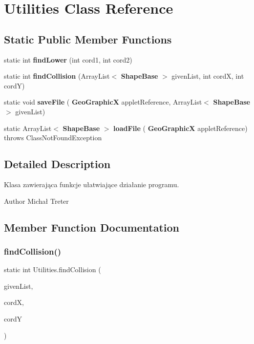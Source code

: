 \section{Utilities Class Reference}
\label{class_utilities}
\subsection*{Static Public Member Functions}
\begin{DoxyCompactItemize}
\item 
static int \textbf{ find\+Lower} (int cord1, int cord2)
\item 
static int \textbf{ find\+Collision} (Array\+List$<$ \textbf{ Shape\+Base} $>$ given\+List, int cordX, int cordY)
\item 
static void \textbf{ save\+File} (\textbf{ Geo\+GraphicX} applet\+Reference, Array\+List$<$ \textbf{ Shape\+Base} $>$ given\+List)
\item 
static Array\+List$<$ \textbf{ Shape\+Base} $>$ \textbf{ load\+File} (\textbf{ Geo\+GraphicX} applet\+Reference)  throws Class\+Not\+Found\+Exception
\end{DoxyCompactItemize}


\subsection{Detailed Description}
Klasa zawierająca funkcje ułatwiające działanie programu. \begin{DoxyAuthor}{Author}
Michał Treter 
\end{DoxyAuthor}


\subsection{Member Function Documentation}
\mbox{\label{class_utilities_a65243cac27f1c4cc2d7f50e17915f942}} 
\subsubsection{find\+Collision()}
{\footnotesize\ttfamily static int Utilities.\+find\+Collision (\begin{DoxyParamCaption}\item[{Array\+List$<$ \textbf{ Shape\+Base} $>$}]{given\+List,  }\item[{int}]{cordX,  }\item[{int}]{cordY }\end{DoxyParamCaption})\hspace{0.3cm}{\ttfamily [static]}}

